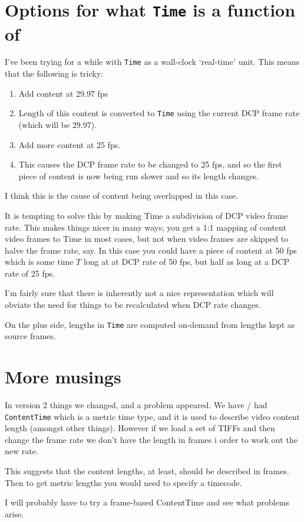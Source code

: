 \documentclass{article}
\begin{document}
\section{Options for what \texttt{Time} is a function of}

I've been trying for a while with \texttt{Time} as a wall-clock
`real-time' unit.  This means that the following is tricky:

\begin{enumerate}
\item Add content at 29.97 fps
\item Length of this content is converted to \texttt{Time} using the
  current DCP frame rate (which will be 29.97).
\item Add more content at 25 fps.
\item This causes the DCP frame rate to be changed to 25 fps, and so
  the first piece of content is now being run slower and so its length
  changes.
\end{enumerate}

I think this is the cause of content being overlapped in this case.

It is tempting to solve this by making Time a subdivision of DCP video
frame rate.  This makes things nicer in many ways; you get a 1:1
mapping of content video frames to Time in most cases, but not when
video frames are skipped to halve the frame rate, say.  In this case
you could have a piece of content at 50 fps which is some time $T$
long at at DCP rate of 50 fps, but half as long at a DCP rate of 25 fps.

I'm fairly sure that there is inherently not a nice representation which
will obviate the need for things to be recalculated when DCP rate changes.

On the plus side, lengths in \texttt{Time} are computed on-demand from
lengths kept as source frames.


\section{More musings}

In version 2 things we changed, and a problem appeared.  We have / had
\texttt{ContentTime} which is a metric time type, and it is used to
describe video content length (amongst other things).  However if we
load a set of TIFFs and then change the frame rate we don't have the
length in frames i order to work out the new rate.

This suggests that the content lengths, at least, should be described
in frames.  Then to get metric lengths you would need to specify a
timecode.

I will probably have to try a frame-based ContentTime and see what
problems arise.
\end{document}
